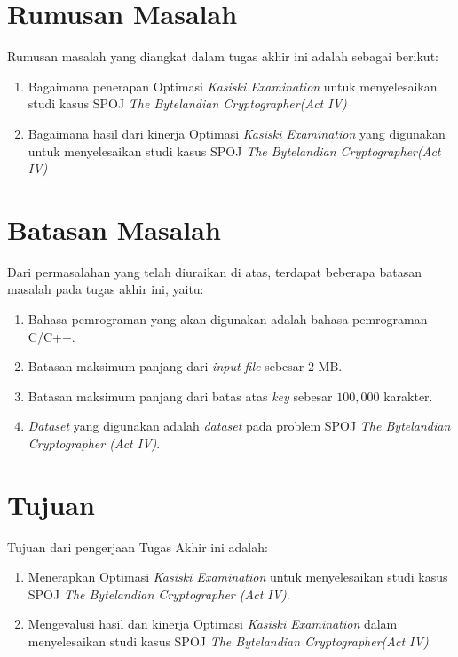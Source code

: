   \section{Rumusan Masalah}
    Rumusan masalah yang diangkat dalam tugas akhir ini adalah sebagai berikut: 
    \begin{enumerate}
      \item Bagaimana penerapan Optimasi \textit{Kasiski Examination} untuk menyelesaikan studi kasus SPOJ \textit{The Bytelandian Cryptographer(Act IV)}
      \item Bagaimana hasil dari kinerja Optimasi \textit{Kasiski Examination} yang digunakan untuk menyelesaikan studi kasus SPOJ \textit{The Bytelandian Cryptographer(Act IV)}
    \end{enumerate}

  \section{Batasan Masalah}
  	\label{batasan-masalah}
    Dari permasalahan yang telah diuraikan di atas, terdapat beberapa batasan masalah pada tugas akhir ini, yaitu:
    \begin{enumerate}
      \item Bahasa pemrograman yang akan digunakan adalah bahasa pemrograman C/C++.
      \item Batasan maksimum panjang dari \textit{input file} sebesar $2$ MB.	
      \item Batasan maksimum panjang dari batas atas \textit{key} sebesar $100,000$ karakter.
      \item \textit{Dataset} yang digunakan adalah \textit{dataset} pada problem SPOJ \textit{The Bytelandian Cryptographer (Act IV)}.
    \end{enumerate}

  \section{Tujuan}
  \label{tujuan}
    Tujuan dari pengerjaan Tugas Akhir ini adalah: 
    \begin{enumerate}
      \item Menerapkan Optimasi \textit{Kasiski Examination} untuk menyelesaikan studi kasus SPOJ \textit{The Bytelandian Cryptographer (Act IV)}.
      \item Mengevalusi hasil dan kinerja Optimasi \textit{Kasiski Examination} dalam menyelesaikan studi kasus SPOJ \textit{The Bytelandian Cryptographer(Act IV)}
    \end{enumerate}
    
